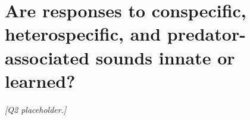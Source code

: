 \section{Are responses to conspecific, heterospecific, and predator-associated sounds innate or learned?}
\label{sec:q2}


\textit{[Q2 placeholder.]}
